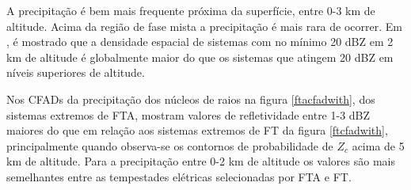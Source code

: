 A precipitação é bem mais frequente próxima da superfície, entre 0-3 km de altitude. Acima da região de fase mista a precipitação é mais rara de ocorrer. Em \cite{liu2008}, é mostrado que a densidade espacial de sistemas com no mínimo 20 dBZ em 2 km de altitude é globalmente maior do que os sistemas que atingem 20 dBZ em níveis superiores de altitude.




Nos CFADs da precipitação dos núcleos de raios na figura \ref{ftacfadwith}, dos sistemas extremos de FTA, mostram valores de refletividade entre 1-3 dBZ maiores do que em relação aos sistemas extremos de FT da figura \ref{ftcfadwith}, principalmente quando observa-se os contornos de probabilidade de $Z_c$ acima de 5 km de altitude. Para a precipitação entre 0-2 km de altitude os valores são mais semelhantes entre as tempestades elétricas selecionadas por FTA e FT. 


